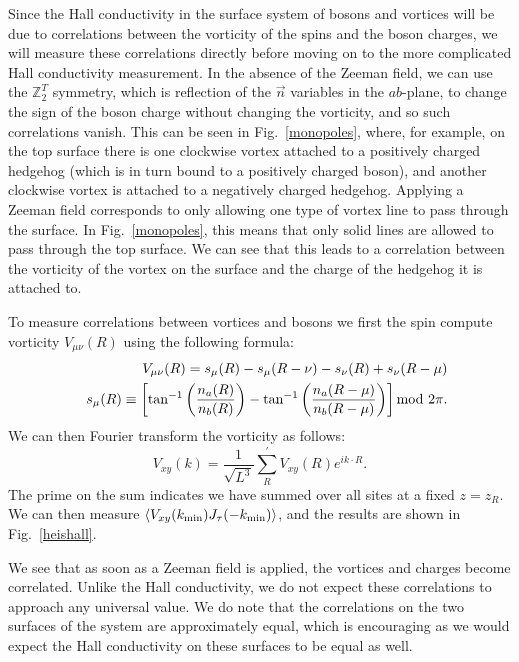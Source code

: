 \documentclass[prb,twocolumn]{revtex4-1}
\def\ra{\rangle} %
\def\la{\langle} %
\def\ztwot{\mathbb{Z}_2^T}
\begin{document}
Since the Hall conductivity in the surface system of bosons and vortices will be due to correlations between the vorticity of the spins and the boson charges,\cite{FQHE} we will measure these correlations directly before moving on to the more complicated Hall conductivity measurement. In the absence of the Zeeman field, we can use the $\ztwot$ symmetry, which is reflection of the $\vec n$ variables in the $ab$-plane, to change the sign of the boson charge without changing the vorticity, and so such correlations vanish. This can be seen in Fig.~\ref{monopoles}, where, for example, on the top surface there is one clockwise vortex attached to a positively charged hedgehog (which is in turn bound to a positively charged boson), and another clockwise vortex is attached to a negatively charged hedgehog. Applying a Zeeman field corresponds to only allowing one type of vortex line to pass through the surface. In Fig.~\ref{monopoles}, this means that only solid lines are allowed to pass through the top surface. We can see that this leads to a correlation between the vorticity of the vortex on the surface and the charge of the hedgehog it is attached to. 

To measure correlations between vortices and bosons we first the spin compute vorticity $V_{\mu\nu}(R)$ using the following formula:
\begin{eqnarray}
&&V_{\mu\nu}(R)=s_{\mu}(R)-s_{\mu}(R-\nu)-s_{\nu}(R)+s_{\nu}(R-\mu)\\
&&s_{\mu}(R)\equiv \left[\tan^{-1}\left(\frac{n_a(R)}{n_b(R)}\right) -\tan^{-1}\left(\frac{n_a(R-\mu)}{n_b(R-\mu)}\right)\right]{\rm mod}~2\pi.\nonumber
\end{eqnarray}
We can then Fourier transform the vorticity as follows:
\begin{equation}
V_{xy}(k)=\frac{1}{\sqrt{L^3}}\sum_{R}  ^\prime V_{xy}(R) e^{ik\cdot R}.
\end{equation}
The prime on the sum indicates we have summed over all sites at a fixed $z=z_R$. We can then measure $\la V_{xy}(k_{\rm min})J_\tau(-k_{\rm min})\ra$, and the results are shown in Fig.~\ref{heishall}. 

We see that as soon as a Zeeman field is applied, the vortices and charges become correlated. Unlike the Hall conductivity, we do not expect these correlations to approach any universal value. We do note that the correlations on the two surfaces of the system are approximately equal, which is encouraging as we would expect the Hall conductivity on these surfaces to be equal as well.
\end{document}
